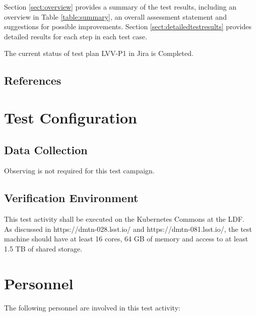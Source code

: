 \documentclass[DM,lsstdraft,STR,toc]{lsstdoc}
\begin{document}
Section \ref{sect:overview} provides a summary of the test results, including an overview in Table \ref{table:summary}, an overall assessment statement and suggestions for possible improvements.
Section \ref{sect:detailedtestresults} provides detailed results for each step in each test case.

The current status of test plan LVV-P1 in Jira is Completed.

\subsection{References}
\label{sect:references}
\renewcommand{\refname}{}

\section{Test Configuration}
\label{sect:configuration}

\subsection{Data Collection}

  Observing is not required for this test campaign.

\subsection{Verification Environment}
\label{sect:hwconf}
  This test activity shall be executed on the Kubernetes Commons at the
LDF.\\
As discussed in https://dmtn-028.lsst.io/ and https://dmtn-081.lsst.io/,
the test machine should have at least 16 cores, 64 GB of memory and
access to at least 1.5 TB of shared storage.





\section{Personnel}
\label{sect:personnel}

The following personnel are involved in this test activity:
\end{document}

